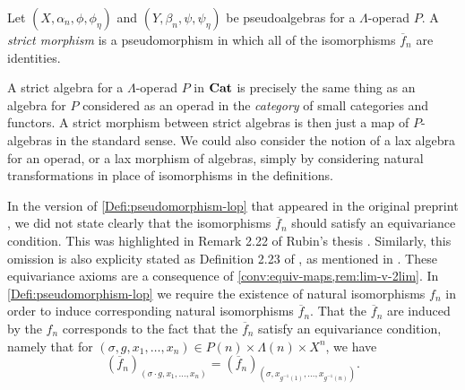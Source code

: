 \begin{Defi}\label{Defi:strictmorphism-lop}
Let $(X, \alpha_n,\phi,\phi_\eta)$ and $(Y, \beta_n,\psi,\psi_{\eta})$ be pseudoalgebras for a $\Lambda$-operad $P$. A \textit{strict morphism} is a pseudomorphism in which all of the isomorphisms $\overline{f}_{n}$ are identities.
\end{Defi}

\begin{rem}
A strict algebra for a $\Lambda$-operad $P$ in $\mathbf{Cat}$ is precisely the same thing as an algebra for $P$ considered as an operad in the \textit{category} of small categories and functors. A strict morphism between strict algebras is then just a map of $P$-algebras in the standard sense. We could also consider the notion of a lax algebra for an operad, or a lax morphism of algebras, simply by considering natural transformations in place of isomorphisms in the definitions.
\end{rem}


\begin{rem}\label{rem:eq-lack}
In the version of \cref{Defi:pseudomorphism-lop} that appeared in the original preprint \cite[Definition 2.4]{cg-preprint}, we did not state clearly that the isomorphisms $\overline{f}_n$ should satisfy an equivariance condition. This was highlighted in Remark 2.22 of Rubin's thesis \cite{rubin-thesis}. Similarly, this omission is also explicity stated as Definition 2.23 of \cite{guillou_symmetric}, as mentioned in \cite{guillou_multiplicative}. These equivariance axioms are a consequence of \cref{conv:equiv-maps,rem:lim-v-2lim}. In \cref{Defi:pseudomorphism-lop} we require the existence of natural isomorphisms $f_n$ in order to induce corresponding natural isomorphisms $\overline{f}_n$. That the $\overline{f}_n$ are induced by the $f_n$ corresponds to the fact that the $\overline{f}_n$ satisfy an equivariance condition, namely that for $(\sigma, g, x_1, \ldots, x_n) \in P(n) \times \Lambda(n) \times X^n$, we have
  \[
    \left(\overline{f}_n\right)_{\left(\sigma \cdot g, x_1, \ldots, x_n\right)} = \left(\overline{f}_n\right)_{\left(\sigma,x_{g^{-1}(1)},\ldots,x_{g^{-1}(n)}\right)}.
  \]
\end{rem}

